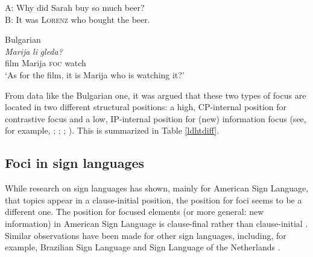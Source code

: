 \begin{exe}
\ex A: Why did Sarah buy so much beer?\\
B: It was \textsc{Lorenz} who bought the beer. \label{constrativefocusexample}
\end{exe}

\begin{exe}
\ex Bulgarian \citep[72]{van1995focus} \\  {\textit{Marija}} {\textit{li}} {\textit{gleda?}}  \\
{film} {Marija} {\textsc{foc}} {watch} \\
\trans `As for the film, it is Marija who is watching it?'   \label{constrativefocusexamplebulgarian}
\end{exe}

\noindent From data like the Bulgarian one, it was argued that these two types of focus are located in two different structural positions: a high, CP-internal position for contrastive focus and a low, IP-internal position for (new) information focus (see, for example, \citealt{beninca2001position}; \citealt{benincapol2004topic}; \citealt{belletti2004aspects}; \citealt{belletti2003i}). This is summarized in Table \ref{ldhtdiff}.

\begin{table}
\caption{Some differences between contrastive and information focus (based on \citealt{kiss1998identificational})\label{ldhtdiff}}
\end{table}


\subsection{Foci in sign languages}
While research on sign languages has shown, mainly for American Sign Language, that topics appear in a clause-initial position, the position for foci seems to be a different one. The position for focused elements (or more general: new information) in American Sign Language is clause-final rather than clause-initial \citep{wilbur1991intonation, wilbur1994foregrounding, wilbur1996evidence, wilbur1997prosodic}. Similar observations have been made for other sign languages, including, for example, Brazilian Sign Language \citep{de1999phrase} and Sign Language of the Netherlands \citep{crasbornkoijiros2012}. 

